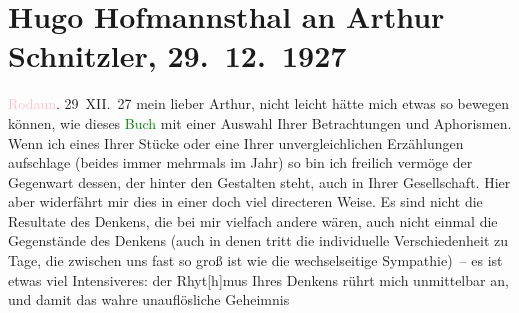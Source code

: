 

               \section[Hugo Hofmannsthal an Arthur Schnitzler, 29. 12. 1927]{ Hugo Hofmannsthal an Arthur Schnitzler, 29. 12. 1927}\nopagebreak{}\rehead{ }\normalsize\beginnumbering{} \toendnotes[C]{\smallbreak\pagebreak[2]} 
\toendnotes[C]{\smallbreak}\pstart
           {\pb}\textcolor{pink}{Rodaun}{}\ledrightnote{\textcolor{pink}{Rodaun}}. 29 XII. 27\pend
           \pstart{}mein lieber Arthur,\pend\pstart
           nicht leicht hätte mich etwas so bewegen können, wie dieses \textcolor{green}{Buch}{}\ledrightnote{\textcolor{green}{Buch der Sprüche und Bedenken}} mit einer Auswahl Ihrer Betrachtungen und Aphorismen.
                    Wenn ich eines Ihrer Stücke oder eine Ihrer unvergleichlichen Erzählungen
                    aufschlage (beides immer mehrmals im Jahr) so bin ich freilich vermöge der
                    Gegenwart dessen, der hinter den Gestalten steht, auch in Ihrer Gesellschaft.
                    Hier aber widerfährt mir dies in einer doch viel directeren Weise. Es sind nicht
                    die Resultate des Denkens, die bei mir vielfach andere wären, auch nicht einmal
                    die Gegenstände des Denkens (auch in denen tritt die individuelle
                    Verschiedenheit zu Tage, die zwischen uns fast so groß ist wie die
                    wechselseitige Sympathie) – {\pb}es ist etwas viel Intensiveres: der Rhyt{[}h{]}mus Ihres
                    Denkens rührt mich unmittelbar an, und damit das wahre unauflösliche Geheimnis
